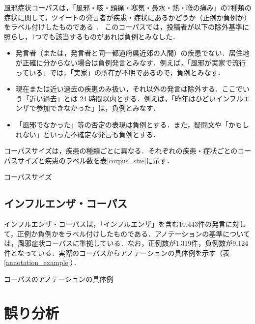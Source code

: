 \documentclass[japanese]{jnlp_1.4}
\begin{document}
風邪症状コーパスは，「風邪・咳・頭痛・寒気・鼻水・熱・喉の痛み」の7種類の症状に関して，ツイートの発言者が疾患・症状にあるかどうか（正例か負例か）をラベル付けしたものである ．
このコーパスでは，投稿者が以下の除外基準に照らし，1つでも該当するものがあれば負例とみなした．

\begin{itemize}
\item 発言者（または，発言者と同一都道府県近郊の人間）の疾患でない．居住地が正確に分からない場合は負例発言とみなす．例えば，「風邪が実家で流行っている」では，「実家」の所在が不明であるので，負例とみなす．
\item 現在または近い過去の疾患のみ扱い，それ以外の発言は除外する．ここでいう「近い過去」とは 24 時間以内とする．例えば，「昨年はひどいインフルエンザで参加できなかった」は，負例とみなす．
\item 「風邪でなかった」等の否定の表現は負例とする．また，疑問文や「かもしれない」といった不確定な発言も負例とする．
\end{itemize}

コーパスサイズは，疾患の種類ごとに異なる．それぞれの疾患・症状ごとのコーパスサイズと疾患のラベル数を表\ref{corpus_size}に示す．

\begin{table}[b]
\caption{コーパスサイズ}
\label{corpus_size}

\end{table}


\subsection{インフルエンザ・コーパス}

インフルエンザ・コーパスは，「インフルエンザ」を含む10,443件の発言に対して，正例か負例かをラベル付けしたものである．アノテーションの基準については，風邪症状コーパスに準拠している．なお，正例数が1,319件，負例数が9,124件となっている．実際のコーパスからアノテーションの具体例を示す（表\ref{annotation_example}）．

\begin{table}[t]
    \caption{コーパスのアノテーションの具体例}
    \label{annotation_example}

\end{table}




\section{誤り分析}
\label{sec:analysis}
\end{document}
